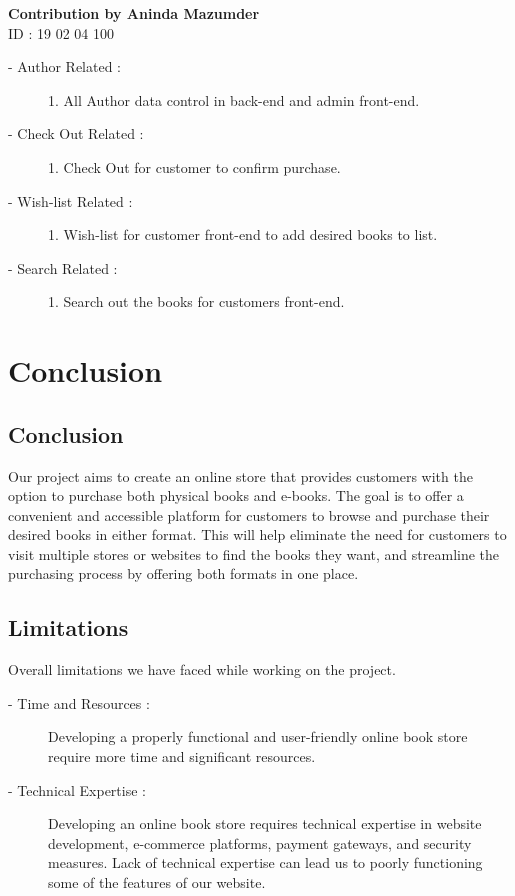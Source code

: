 \documentclass[12pt,a4paper]{article}
\begin{document}
\vspace{5mm}
{\large\textbf{Contribution by Aninda Mazumder}}
\\ID : 19 02 04 100
\begin{description}
    \item[\hspace{7mm}- Author Related :] 1. All Author data control in back-end and admin front-end.
    \item[\hspace{7mm}- Check Out Related :] 1. Check Out for customer to confirm purchase.
    \item[\hspace{7mm}- Wish-list Related :] 1. Wish-list for customer front-end to add desired books to list.
    \item[\hspace{7mm}- Search Related :] 1. Search out the books for customers front-end.
\end{description}


\section{Conclusion}
\subsection{Conclusion}
Our project aims to create an online store that provides customers with the option to purchase both physical books and e-books. The goal is to offer a convenient and accessible platform for customers to browse and purchase their desired books in either format. This will help eliminate the need for customers to visit multiple stores or websites to find the books they want, and streamline the purchasing process by offering both formats in one place.
\subsection{Limitations}
Overall limitations we have faced while working on the project.
\begin{description}
    \item[\hspace{7mm}- Time and Resources :] Developing a properly functional and user-friendly online book store require more time and significant resources.
    \item[\hspace{7mm}- Technical Expertise :] Developing an online book store requires technical expertise in website development, e-commerce platforms, payment gateways, and security measures. Lack of technical expertise can lead us to poorly functioning some of the features of our website.
\end{description}
\end{document}
